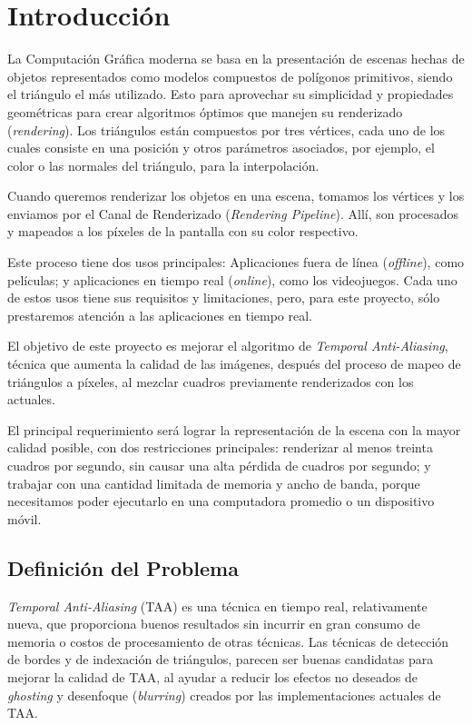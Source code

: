 \documentclass[pregrado]{tesis-usb} %
\begin{document}
\mainmatter

\chapter[Introducción]{Introducción}
La Computación Gráfica moderna se basa en la presentación de escenas hechas de objetos representados como modelos compuestos de polígonos primitivos, siendo el triángulo el más utilizado. Esto para aprovechar su simplicidad y propiedades geométricas para crear algoritmos óptimos que manejen su renderizado (\textit{rendering}). Los triángulos están compuestos por tres vértices, cada uno de los cuales consiste en una posición y otros parámetros asociados, por ejemplo, el color o las normales del triángulo, para la interpolación.

Cuando queremos renderizar los objetos en una escena, tomamos los vértices y los enviamos por el Canal de Renderizado (\textit{Rendering Pipeline}). Allí, son procesados y mapeados a los píxeles de la pantalla con su color respectivo.

Este proceso tiene dos usos principales: Aplicaciones fuera de línea (\textit{offline}), como películas; y aplicaciones en tiempo real (\textit{online}), como los videojuegos. Cada uno de estos usos tiene sus requisitos y limitaciones, pero, para este proyecto, sólo prestaremos atención a las aplicaciones en tiempo real.

El objetivo de este proyecto es mejorar el algoritmo de \textit{Temporal Anti-Aliasing}, técnica que aumenta la calidad de las imágenes, después del proceso de mapeo de triángulos a píxeles, al mezclar cuadros previamente renderizados con los actuales.

El principal requerimiento será lograr la representación de la escena con la mayor calidad posible, con dos restricciones principales: renderizar al menos treinta cuadros por segundo, sin causar una alta pérdida de cuadros por segundo; y trabajar con una cantidad limitada de memoria y ancho de banda, porque necesitamos poder ejecutarlo en una computadora promedio o un dispositivo móvil. \cite{Doggett2017EDAN35, Shreiner2011}


\section{Definición del Problema}
\textit{Temporal Anti-Aliasing} (TAA) es una técnica en tiempo real, relativamente nueva, que proporciona buenos resultados sin incurrir en gran consumo de memoria o costos de procesamiento de otras técnicas. Las técnicas de detección de bordes y de indexación de triángulos, parecen ser buenas candidatas para mejorar la calidad de TAA, al ayudar a reducir los efectos no deseados de \textit{ghosting} y desenfoque  (\textit{blurring}) creados por las implementaciones actuales de TAA.
\end{document}
